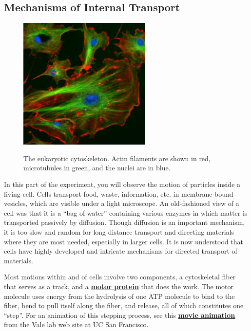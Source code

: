 \documentclass{../lab}
\begin{document}
\subsection{Mechanisms of Internal Transport}

\begin{figure}[h]
    \centering
    \href{http://experimentationlab.berkeley.edu/sites/default/files/images/250px-BMC_Cytoskeleton.jpg}{\includegraphics[width=0.5\linewidth]{images/250px-BMC_Cytoskeleton.jpg}}
    \caption{The eukaryotic cytoskeleton. Actin filaments are shown in red, microtubules in green, and the nuclei are in blue.}
    \label{fig:250px-BMC_Cytoskeleton}
\end{figure}

In this part of the experiment, you will observe the motion of particles inside a living cell. Cells transport food, waste, information, etc. in membrane-bound vesicles, which are visible under a light microscope. An old-fashioned view of a cell was that it is a ``bag of water'' containing various enzymes in which matter is transported passively by diffusion. Though diffusion is an important mechanism, it is too slow and random for long distance transport and directing materials where they are most needed, especially in larger cells. It is now understood that cells have highly developed and intricate mechanisms for directed transport of materials.

Most motions within and of cells involve two components, a cytoskeletal fiber that serves as a track, and a \href{http://physics111.lib.berkeley.edu/Physics111/Reprints/OTZ/biowikipedia.pdf}{\textbf{motor protein}} that does the work. The motor molecule uses energy from the hydrolysis of one ATP molecule to bind to the fiber, bend to pull itself along the fiber, and release, all of which constitutes one ``step''. For an animation of this stepping process, see this \href{https://valelab.ucsf.edu/molecular-animations/}{\textbf{movie animation}} from the Vale lab web site at UC San Francisco. 
\end{document}
